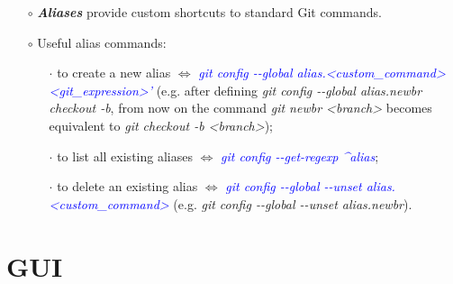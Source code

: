 \documentclass[a4paper,portrait,10pt]{article}   %
\newcommand{\mybulletlvA}{$\circ$}   %
\newcommand{\mybulletlvB}{$\cdot$}   %
\newcommand{\mydiv}{$\Leftrightarrow$ }   %
\newcommand{\mysapo}[1]{\textquotesingle #1\textquotesingle }   %
\newcommand{\mycmd}[1]{\textcolor{blue}{\textit{#1}}}   %
\newcommand{\myparvspace}{\vspace{4mm}}   %
\newcommand{\mysecvspace}{\vspace{6mm}}   %
\begin{document}
\begin{itemize}
\item[\mybulletlvA] \textbf{\textit{Aliases}} provide custom shortcuts to standard Git commands.
\myparvspace

\item[\mybulletlvA] Useful alias commands:
\begin{itemize}
  \item[\mybulletlvB] to create a new alias \mydiv \mycmd{git config -{}-global alias.<custom\_command> \mysapo{<git\_expression>}'} (e.g. after defining \textit{git config -{}-global alias.newbr \mysapo{checkout -b}}, from now on the command \textit{git newbr <branch>} becomes equivalent to \textit{git checkout -b <branch>});
  \item[\mybulletlvB] to list all existing aliases \mydiv \mycmd{git config -{}-get-regexp \textasciicircum alias};
  \item[\mybulletlvB] to delete an existing alias \mydiv \mycmd{git config -{}-global -{}-unset alias.<custom\_command>} (e.g. \textit{git config -{}-global -{}-unset alias.newbr}).
\end{itemize}
\end{itemize}
\mysecvspace


\section{GUI}   \label{sec:GUI}
\end{document}
